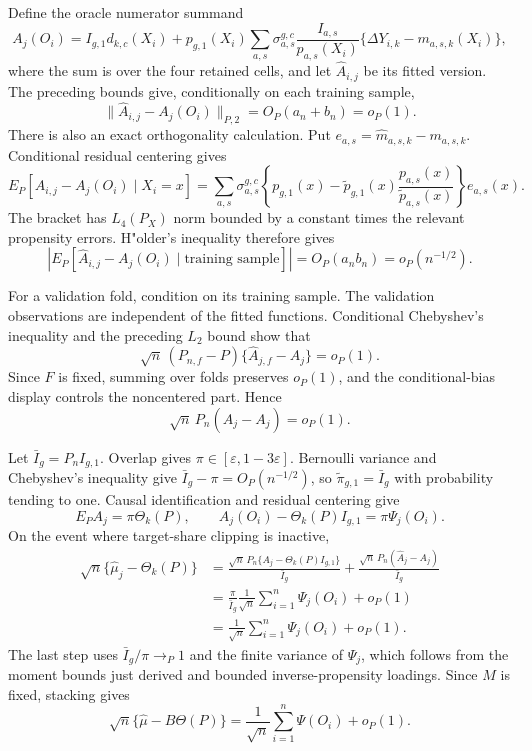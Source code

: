 Define the oracle numerator summand
\[
 A_j(O_i)=I_{g,1}d_{k,c}(X_i)
 +p_{g,1}(X_i)\sum_{a,s}\sigma_{a,s}^{g,c}
 \frac{I_{a,s}}{p_{a,s}(X_i)}
 \{\Delta Y_{i,k}-m_{a,s,k}(X_i)\},
\]
where the sum is over the four retained cells, and let \(\widehat A_{i,j}\) be its fitted version. The preceding bounds give, conditionally on each training sample,
\[
 \|\widehat A_{i,j}-A_j(O_i)\|_{P,2}=O_P(a_n+b_n)=o_P(1).
\]
There is also an exact orthogonality calculation. Put \(e_{a,s}=\widehat m_{a,s,k}-m_{a,s,k}\). Conditional residual centering gives
\[
 E_P[\widehat A_{i,j}-A_j(O_i)\mid X_i=x]
 =\sum_{a,s}\sigma_{a,s}^{g,c}
 \left\{p_{g,1}(x)-\widetilde p_{g,1}(x)
 \frac{p_{a,s}(x)}{\widetilde p_{a,s}(x)}\right\}e_{a,s}(x).
\]
The bracket has \(L_4(P_X)\) norm bounded by a constant times the relevant propensity errors. H"older's inequality therefore gives
\[
 \left|E_P[\widehat A_{i,j}-A_j(O_i)\mid\text{training sample}]\right|
 =O_P(a_nb_n)=o_P(n^{-1/2}).
\]

For a validation fold, condition on its training sample. The validation observations are independent of the fitted functions. Conditional Chebyshev's inequality and the preceding \(L_2\) bound show that
\[
 \sqrt n\,(P_{n,f}-P)\{\widehat A_{j,f}-A_j\}=o_P(1).
\]
Since \(F\) is fixed, summing over folds preserves \(o_P(1)\), and the conditional-bias display controls the noncentered part. Hence
\[
 \sqrt n\,P_n(\widehat A_j-A_j)=o_P(1).
\]

Let \(\bar I_g=P_nI_{g,1}\). Overlap gives \(\pi\in[\varepsilon,1-3\varepsilon]\). Bernoulli variance and Chebyshev's inequality give \(\bar I_g-\pi=O_P(n^{-1/2})\), so \(\widetilde\pi_{g,1}=\bar I_g\) with probability tending to one. Causal identification and residual centering give
\[
 E_PA_j=\pi\Theta_k(P),
 \qquad
 A_j(O_i)-\Theta_k(P)I_{g,1}=\pi\Psi_j(O_i).
\]
On the event where target-share clipping is inactive,
\[
\begin{aligned}
 \sqrt n\{\widehat\mu_j-\Theta_k(P)\}
 &=\frac{\sqrt n\,P_n\{A_j-\Theta_k(P)I_{g,1}\}}
         {\bar I_g}
   +\frac{\sqrt n\,P_n(\widehat A_j-A_j)}{\bar I_g}\\
 &=\frac{\pi}{\bar I_g}\frac1{\sqrt n}
   \sum_{i=1}^n\Psi_j(O_i)+o_P(1)\\
 &=\frac1{\sqrt n}\sum_{i=1}^n\Psi_j(O_i)+o_P(1).
\end{aligned}
\]
The last step uses \(\bar I_g/\pi\to_P1\) and the finite variance of \(\Psi_j\), which follows from the moment bounds just derived and bounded inverse-propensity loadings. Since \(M\) is fixed, stacking gives
\[
 \sqrt n\{\widehat\mu-B\Theta(P)\}
 =\frac1{\sqrt n}\sum_{i=1}^n\Psi(O_i)+o_P(1).
\]

